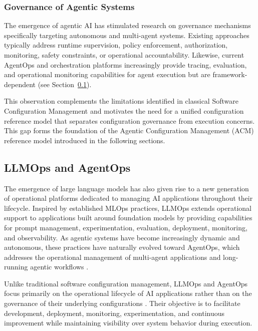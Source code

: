 \documentclass[10pt]{article}
\begin{document}
\subsubsection{Governance of Agentic Systems}
\label{sec:agentic_governance}

The emergence of agentic AI has stimulated research on governance mechanisms specifically targeting autonomous and multi-agent systems. Existing approaches typically address runtime supervision, policy enforcement, authorization, monitoring, safety constraints, or operational accountability. Likewise, current AgentOps and orchestration platforms increasingly provide tracing, evaluation, and operational monitoring capabilities for agent execution but are framework-dependent (see Section~\ref{sec:llmops_agentops}).

This observation complements the limitations identified in classical Software Configuration Management and motivates the need for a unified configuration reference model that separates configuration governance from execution concerns. This gap forms the foundation of the Agentic Configuration Management (ACM) reference model introduced in the following sections.

\subsection{LLMOps and AgentOps}
\label{sec:llmops_agentops}

The emergence of large language models has also given rise to a new generation of operational platforms dedicated to managing AI applications throughout their lifecycle. Inspired by established MLOps practices, LLMOps extends operational support to applications built around foundation models by providing capabilities for prompt management, experimentation, evaluation, deployment, monitoring, and observability. As agentic systems have become increasingly dynamic and autonomous, these practices have naturally evolved toward AgentOps, which addresses the operational management of multi-agent applications and long-running agentic workflows \cite{cesarano2026grand, shavit2023practices, pandey2025agentic, dumas2026}.

Unlike traditional software configuration management, LLMOps and AgentOps focus primarily on the operational lifecycle of AI applications rather than on the governance of their underlying configurations \cite{pahune2025transitioning, amershi2019, dong2024agentops}. Their objective is to facilitate development, deployment, monitoring, experimentation, and continuous improvement while maintaining visibility over system behavior during execution.
\end{document}
